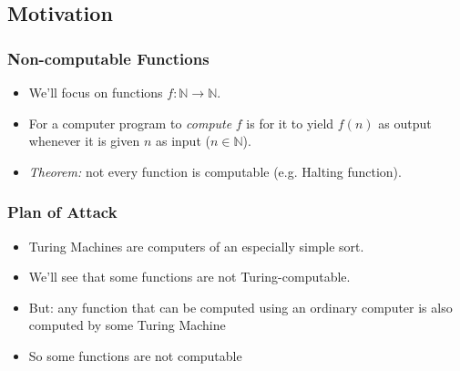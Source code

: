 \subsection{Motivation}

\begin{frame}
\frametitle{Non-computable Functions}

\begin{itemize}[<+->]

\item We'll focus on functions $f: \mathbb{N} \rightarrow \mathbb{N}$.

\item For a computer program to \emph{compute} $f$ is for it to yield $f(n)$ as output whenever it is given $n$ as input ($n \in \mathbb{N}$). 

\item \emph{Theorem:} not every function is computable (e.g. Halting function).


\end{itemize}
\end{frame}

\begin{frame}
\frametitle{Plan of Attack}

\begin{itemize}[<+->]

\item Turing Machines are computers of an especially simple sort.

\item We'll see that some functions are not Turing-computable.

\item But: any function that can be computed using an ordinary computer is also computed by some Turing Machine 

\item So some functions are not computable 

\end{itemize}
\end{frame}

